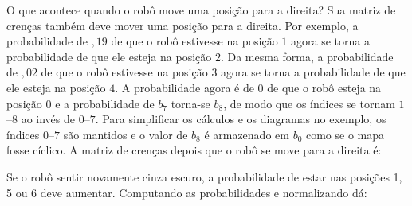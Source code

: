 O que acontece quando o robô move uma posição para a direita? Sua matriz de crenças também deve mover uma posição para a direita. Por exemplo, a probabilidade de $,19$ de que o robô estivesse na posição $1$ agora se torna a probabilidade de que ele esteja na posição $2$. Da mesma forma, a probabilidade de $,02$ de que o robô estivesse na posição $3$ agora se torna a probabilidade de que ele esteja na posição $4$. A probabilidade agora é de $0$ de que o robô esteja na posição $0$ e a probabilidade de $b_7$ torna-se $b_8$, de modo que os índices se tornam $1$--$8$ ao invés de $0$--$7$. Para simplificar os cálculos e os diagramas no exemplo, os índices $0$--$7$ são mantidos e o valor de $b_8$ é armazenado em $b_0$ como se o mapa fosse cíclico. A matriz de crenças depois que o robô se move para a direita é:
\begin{center}
\end{center}

Se o robô sentir novamente cinza escuro, a probabilidade de estar nas posições 1, 5 ou 6 deve aumentar. Computando as probabilidades e normalizando dá:
\begin{center}
\end{center}

